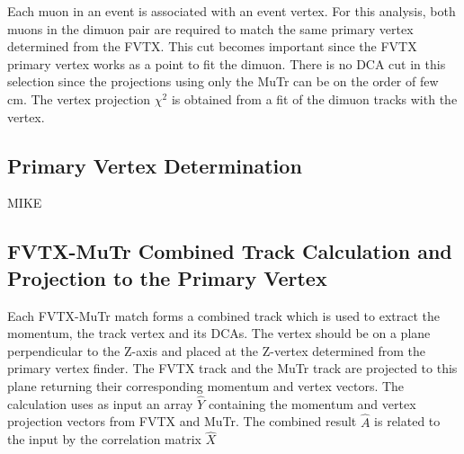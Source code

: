 \documentclass[12pt]{article}
\begin{document}
Each muon in an event is associated with an event vertex. For this analysis, both muons 
in the dimuon pair are required to match the same primary
vertex determined from the FVTX. This cut becomes important since the FVTX
primary vertex works as a point to fit the dimuon. There is no DCA cut in this selection since the
projections using only the MuTr can be on the order of few cm. 
The vertex projection $\chi^2$ is obtained from a fit of the dimuon tracks with the vertex. 

\subsection{Primary Vertex Determination}
\label{sec:PVDet}

MIKE

\subsection{FVTX-MuTr Combined Track Calculation and Projection to the Primary Vertex}
\label{sec:combine_fvtx_mutr}

Each FVTX-MuTr match forms a combined track which is used to extract the momentum, the track vertex and its DCAs. 
The vertex should be on a plane perpendicular to the Z-axis and placed at the Z-vertex determined from the primary vertex finder. 
The FVTX track and the MuTr track are projected to this plane returning their corresponding momentum and vertex vectors.
The calculation uses as input an array $\hat{Y}$ containing the momentum and vertex projection vectors from FVTX and MuTr. 
The combined result $\hat{A}$ is related to the input by the correlation matrix $\hat{X}$ 
\end{document}

